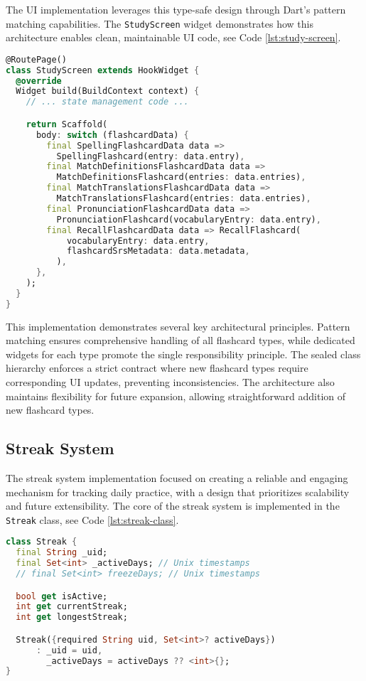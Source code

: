 The UI implementation leverages this type-safe design through Dart's pattern matching capabilities. The \texttt{StudyScreen} widget demonstrates how this architecture enables clean, maintainable UI code, see Code \ref{lst:study-screen}.

\begin{lstlisting}[language=Dart, caption={StudyScreen widget with pattern matching}, label=lst:study-screen]
@RoutePage()
class StudyScreen extends HookWidget {
  @override
  Widget build(BuildContext context) {
    // ... state management code ...

    return Scaffold(
      body: switch (flashcardData) {
        final SpellingFlashcardData data =>
          SpellingFlashcard(entry: data.entry),
        final MatchDefinitionsFlashcardData data =>
          MatchDefinitionsFlashcard(entries: data.entries),
        final MatchTranslationsFlashcardData data =>
          MatchTranslationsFlashcard(entries: data.entries),
        final PronunciationFlashcardData data =>
          PronunciationFlashcard(vocabularyEntry: data.entry),
        final RecallFlashcardData data => RecallFlashcard(
            vocabularyEntry: data.entry,
            flashcardSrsMetadata: data.metadata,
          ),
      },
    );
  }
}
\end{lstlisting}

This implementation demonstrates several key architectural principles. Pattern matching ensures comprehensive handling of all flashcard types, while dedicated widgets for each type promote the single responsibility principle. The sealed class hierarchy enforces a strict contract where new flashcard types require corresponding UI updates, preventing inconsistencies. The architecture also maintains flexibility for future expansion, allowing straightforward addition of new flashcard types.

\subsection{Streak System}

The streak system implementation focused on creating a reliable and engaging mechanism for tracking daily practice, with a design that prioritizes scalability and future extensibility. The core of the streak system is implemented in the \texttt{Streak} class, see Code \ref{lst:streak-class}.

\begin{lstlisting}[language=Dart, caption={Streak class implementation}, label=lst:streak-class]
class Streak {
  final String _uid;
  final Set<int> _activeDays; // Unix timestamps
  // final Set<int> freezeDays; // Unix timestamps

  bool get isActive;
  int get currentStreak;
  int get longestStreak;

  Streak({required String uid, Set<int>? activeDays})
      : _uid = uid,
        _activeDays = activeDays ?? <int>{};
}
\end{lstlisting}

